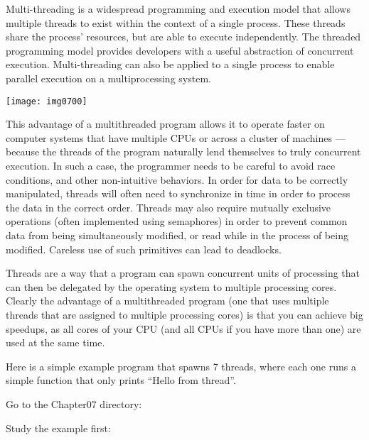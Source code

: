Multi-threading is a widespread programming and execution model that allows multiple threads to exist within the context of a single process. These threads share the process' resources, but are able to execute independently. The threaded programming model provides developers with a useful abstraction of concurrent execution. Multi-threading can also be applied to a single process to enable parallel execution on a multiprocessing system.

\texttt{[image: img0700]}

This advantage of a multithreaded program allows it to operate faster on computer systems that have multiple CPUs or across a cluster of machines --- because the threads of the program naturally lend themselves to truly concurrent execution. In such a case, the programmer needs to be careful to avoid race conditions, and other non-intuitive behaviors. In order for data to be correctly manipulated, threads will often need to synchronize in time in order to process the data in the correct order. Threads may also require mutually exclusive operations (often implemented using semaphores) in order to prevent common data from being simultaneously modified, or read while in the process of being modified. Careless use of such primitives can lead to deadlocks.

Threads are a way that a program can spawn concurrent units of processing that can then be delegated by the operating system to multiple processing cores. Clearly the advantage of a multithreaded program (one that uses multiple threads that are assigned to multiple processing cores) is that you can achieve big speedups, as all cores of your CPU (and all CPUs if you have more than one) are used at the same time.

Here is a simple example program that spawns 7 threads, where each one runs a simple function that only prints ``Hello from thread''.

Go to the Chapter07 directory:

\begin{prompt}
$ %
\end{prompt}



Study the example first:

